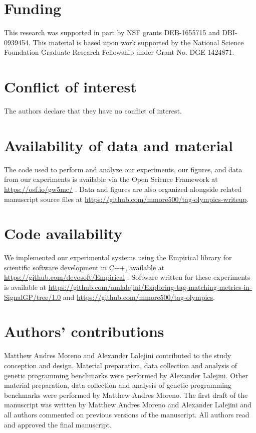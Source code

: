 \section*{Funding}

This research was supported in part by NSF grants DEB-1655715 and DBI-0939454.
This material is based upon work supported by the National Science Foundation Graduate Research Fellowship under Grant No. DGE-1424871.


\section*{Conflict of interest}

The authors declare that they have no conflict of interest.

\section*{Availability of data and material}

The code used to perform and analyze our experiments, our figures, and data from our experiments is available via the Open Science Framework at \url{https://osf.io/gw5mc/} \citep{foster2017open}.
Data and figures are also organized alongside related manuscript source files at \url{https://github.com/mmore500/tag-olympics-writeup}.

\section*{Code availability}

We implemented our experimental systems using the Empirical library for scientific software development in C++, available at \url{https://github.com/devosoft/Empirical} \citep{charles_ofria_2019_2575607}.
Software written for these experiments is available at \url{https://github.com/amlalejini/Exploring-tag-matching-metrics-in-SignalGP/tree/1.0} and \url{https://github.com/mmore500/tag-olympics}.

\section*{Authors' contributions} Matthew Andres Moreno and Alexander Lalejini contributed to the study conception and design.
Material preparation, data collection and analysis of genetic programming benchmarks were performed by Alexander Lalejini.
Other material preparation, data collection and analysis of genetic programming benchmarks were performed by Matthew Andres Moreno.
The first draft of the manuscript was written by Matthew Andres Moreno and Alexander Lalejini and all authors commented on previous versions of the manuscript.
All authors read and approved the final manuscript.
